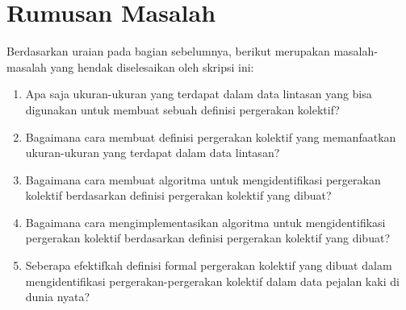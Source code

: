 \iffalse

\lionov{tambahin bahwa setelah itu akan dilakukan eksperimen dengan data nyata lintasan yang tersedia di internet (lihat bab 5 di thesis) dan akan dibandingkan hasilnya dengan hasil dari eksperimen sebelumnya (jangna lupa jelasin bahwa di eksperimen sebelumnya, yang dibandingkan itu cuma grup, gak ngebandingin tempat dan waktu). Terus harus disinggung bahwa di data eksperimen itu, udah ada grup yang ditentukan oleh manusia, jadi nanti hasil program akan dibandingkan dengan kunci jawabannya.} \cristopher{Di atas kan udah saya sebuat kalo identifikasinya akan diuji dengan dibandingkan, kalo gitu kudu rephrase atau biarin ajah ko?}

\fi

\section{Rumusan Masalah}
\label{sec:rumusan}

Berdasarkan uraian pada bagian sebelumnya, berikut merupakan masalah-masalah yang hendak diselesaikan oleh skripsi ini:
\iffalse

\lionov{masalah pertama itu ukuran apa saja yang bisa digunakan, kedua bagaimana membuat model pergerakan kolektif yang memanfaatkan ukuran lintasan, yang ketiga bagaimana membuat algoritmanya. Soalnya yang poin 2 dan 3 kan gak dilakukan, elu gak ngebahas berbagai definisi formal, ukuran, teknik, dan algoritma (karena pertanyaannya ``apa aja''}

\fi
\begin{enumerate}
    \item Apa saja ukuran-ukuran yang terdapat dalam data lintasan yang bisa digunakan untuk membuat sebuah definisi pergerakan kolektif?
    \item Bagaimana cara membuat definisi pergerakan kolektif yang memanfaatkan ukuran-ukuran yang terdapat dalam data lintasan?
    \item Bagaimana cara membuat algoritma untuk mengidentifikasi pergerakan kolektif berdasarkan definisi pergerakan kolektif yang dibuat?
    \item Bagaimana cara mengimplementasikan algoritma untuk mengidentifikasi pergerakan kolektif berdasarkan definisi pergerakan kolektif yang dibuat?
    \item Seberapa efektifkah definisi formal pergerakan kolektif yang dibuat dalam mengidentifikasi pergerakan-pergerakan kolektif dalam data pejalan kaki di dunia nyata?
\end{enumerate}

